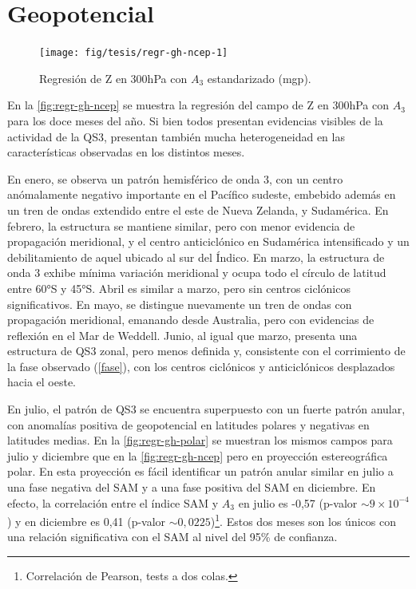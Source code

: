 \documentclass[spanish,a4paper,12pt,oneside]{book}
\let\rmarkdownfootnote\footnote%
\def\footnote{\protect\rmarkdownfootnote}
\begin{document}
\section*{Geopotencial}

\begin{landscape}\begin{figure}

{\centering \texttt{[image: fig/tesis/regr-gh-ncep-1]} 

}

\caption{Regresión de Z en 300hPa con $A_3$ estandarizado (mgp).}\label{fig:regr-gh-ncep}
\end{figure}
\end{landscape}

En la \autoref{fig:regr-gh-ncep} se muestra la regresión del campo de Z
en 300hPa con \(A_3\) para los doce meses del año. Si bien todos
presentan evidencias visibles de la actividad de la QS3, presentan
también mucha heterogeneidad en las características observadas en los
distintos meses.

En enero, se observa un patrón hemisférico de onda 3, con un centro
anómalamente negativo importante en el Pacífico sudeste, embebido además
en un tren de ondas extendido entre el este de Nueva Zelanda, y
Sudamérica. En febrero, la estructura se mantiene similar, pero con
menor evidencia de propagación meridional, y el centro anticiclónico en
Sudamérica intensificado y un debilitamiento de aquel ubicado al sur del
Índico. En marzo, la estructura de onda 3 exhibe mínima variación
meridional y ocupa todo el círculo de latitud entre 60°S y 45°S. Abril
es similar a marzo, pero sin centros ciclónicos significativos. En mayo,
se distingue nuevamente un tren de ondas con propagación meridional,
emanando desde Australia, pero con evidencias de reflexión en el Mar de
Weddell. Junio, al igual que marzo, presenta una estructura de QS3
zonal, pero menos definida y, consistente con el corrimiento de la fase
observado (\autoref{fase}), con los centros ciclónicos y anticiclónicos
desplazados hacia el oeste.

En julio, el patrón de QS3 se encuentra superpuesto con un fuerte patrón
anular, con anomalías positiva de geopotencial en latitudes polares y
negativas en latitudes medias. En la \autoref{fig:regr-gh-polar} se
muestran los mismos campos para julio y diciembre que en la
\autoref{fig:regr-gh-ncep} pero en proyección estereográfica polar. En
esta proyección es fácil identificar un patrón anular similar en julio a
una fase negativa del SAM y a una fase positiva del SAM en diciembre. En
efecto, la correlación entre el índice SAM y \(A_3\) en julio es -0,57
(p-valor \(\sim 9\times 10^{-4}\)) y en diciembre es 0,41 (p-valor
\(\sim 0,0225\))\footnote{Correlación de Pearson, tests a dos colas.}.
Estos dos meses son los únicos con una relación significativa con el SAM
al nivel del 95\% de confianza.
\end{document}
